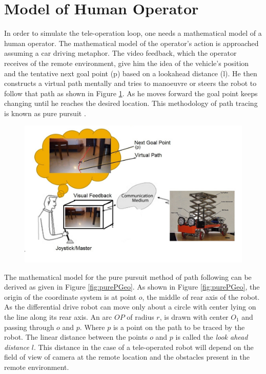 \section{Model of Human Operator}
In order to simulate the tele-operation loop, one needs a mathematical model of a human operator. The mathematical  model of the operator's action is approached assuming a car driving metaphor.
 The video feedback, which the operator receives of the remote environment, give him the idea of the vehicle's  position and the tentative next goal point (p) based on a lookahead distance (l). He then constructs a  virtual path mentally and tries to manoeuvre or steers the robot to follow that path as shown in Figure \ref{fig:drivingStratagy}. As he moves forward the goal point keeps changing until he reaches the desired location. This methodology of path tracing is known as pure pursuit \cite{coulter1992implementation}. 
\begin{figure}
	\includegraphics[width=\linewidth,keepaspectratio]{Chapter6/fig/mentalMap}
	\label{fig:drivingStratagy} 
\end{figure}

The mathematical model for the pure pursuit method of path following can be derived as given in Figure \ref{fig:purePGeo}.
As shown in Figure \ref{fig:purePGeo}, the origin of the coordinate system is at point $o$, the middle of rear axis of the robot. As the differential drive robot  can move only about a circle with center  lying on the line along its rear axis. An arc $OP$ of radius $r$, is drawn with center $O_1$ and passing through $o$ and $p$. Where $p$ is a point on the path to be traced by the robot. The linear distance  between the points $o$ and  $p$ is called the\textit{ look ahead distance} $l$. This distance in the case of a tele-operated robot will depend on the field of view of camera at the remote location and the obstacles present in the remote environment.

